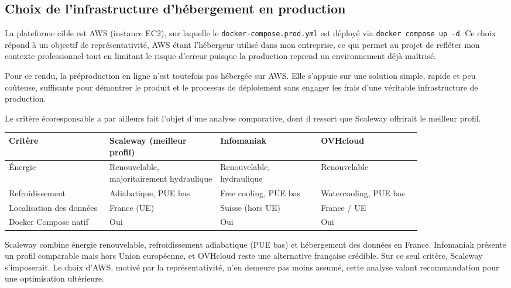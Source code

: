 \newpage
\subsection{Choix de l'infrastructure d'hébergement en production}
La plateforme cible est AWS (instance EC2), sur laquelle le \texttt{docker-compose.prod.yml} est déployé via \texttt{docker compose up -d}. Ce choix répond à un objectif de représentativité, AWS étant l'hébergeur utilisé dans mon entreprise, ce qui permet au projet de refléter mon contexte professionnel tout en limitant le risque d'erreur puisque la production reprend un environnement déjà maîtrisé.

Pour ce rendu, la préproduction en ligne n'est toutefois pas hébergée sur AWS. Elle s'appuie sur une solution simple, rapide et peu coûteuse, suffisante pour démontrer le produit et le processus de déploiement sans engager les frais d'une véritable infrastructure de production.

Le critère écoresponsable a par ailleurs fait l'objet d'une analyse comparative, dont il ressort que Scaleway offrirait le meilleur profil.

\begin{table}[H]
    \centering
    \small
    \begin{tabular}{|>{\raggedright\arraybackslash}p{0.20\linewidth}|>{\raggedright\arraybackslash}p{0.22\linewidth}|>{\raggedright\arraybackslash}p{0.20\linewidth}|>{\raggedright\arraybackslash}p{0.20\linewidth}|}
        \hline
        \textbf{Critère} & \textbf{Scaleway (meilleur profil)} & \textbf{Infomaniak} & \textbf{OVHcloud} \\
        \hline
        Énergie & Renouvelable, majoritairement hydraulique & Renouvelable, hydraulique & Renouvelable \\
        \hline
        Refroidissement & Adiabatique, PUE bas & Free cooling, PUE bas & Watercooling, PUE bas \\
        \hline
        Localisation des données & France (UE) & Suisse (hors UE) & France / UE \\
        \hline
        Docker Compose natif & Oui & Oui & Oui \\
        \hline
    \end{tabular}
\end{table}

Scaleway combine énergie renouvelable, refroidissement adiabatique (PUE bas) et hébergement des données en France. Infomaniak présente un profil comparable mais hors Union européenne, et OVHcloud reste une alternative française crédible. Sur ce seul critère, Scaleway s'imposerait. Le choix d'AWS, motivé par la représentativité, n'en demeure pas moins assumé, cette analyse valant recommandation pour une optimisation ultérieure.

